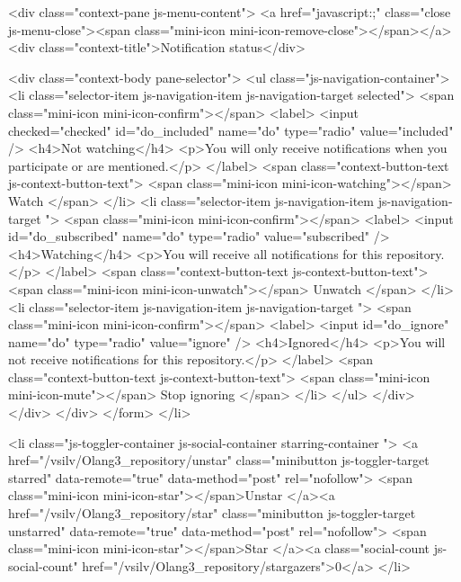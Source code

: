     <div class="context-pane js-menu-content">
      <a href="javascript:;" class="close js-menu-close"><span class="mini-icon mini-icon-remove-close"></span></a>
      <div class="context-title">Notification status</div>

      <div class="context-body pane-selector">
        <ul class="js-navigation-container">
          <li class="selector-item js-navigation-item js-navigation-target selected">
            <span class="mini-icon mini-icon-confirm"></span>
            <label>
              <input checked="checked" id="do_included" name="do" type="radio" value="included" />
              <h4>Not watching</h4>
              <p>You will only receive notifications when you participate or are mentioned.</p>
            </label>
            <span class="context-button-text js-context-button-text">
              <span class="mini-icon mini-icon-watching"></span>
              Watch
            </span>
          </li>
          <li class="selector-item js-navigation-item js-navigation-target ">
            <span class="mini-icon mini-icon-confirm"></span>
            <label>
              <input id="do_subscribed" name="do" type="radio" value="subscribed" />
              <h4>Watching</h4>
              <p>You will receive all notifications for this repository.</p>
            </label>
            <span class="context-button-text js-context-button-text">
              <span class="mini-icon mini-icon-unwatch"></span>
              Unwatch
            </span>
          </li>
          <li class="selector-item js-navigation-item js-navigation-target ">
            <span class="mini-icon mini-icon-confirm"></span>
            <label>
              <input id="do_ignore" name="do" type="radio" value="ignore" />
              <h4>Ignored</h4>
              <p>You will not receive notifications for this repository.</p>
            </label>
            <span class="context-button-text js-context-button-text">
              <span class="mini-icon mini-icon-mute"></span>
              Stop ignoring
            </span>
          </li>
        </ul>
      </div>
    </div>
  </div>
</form>
          </li>

          <li class="js-toggler-container js-social-container starring-container ">
            <a href="/vsilv/Olang3_repository/unstar" class="minibutton js-toggler-target starred" data-remote="true" data-method="post" rel="nofollow">
              <span class="mini-icon mini-icon-star"></span>Unstar
            </a><a href="/vsilv/Olang3_repository/star" class="minibutton js-toggler-target unstarred" data-remote="true" data-method="post" rel="nofollow">
              <span class="mini-icon mini-icon-star"></span>Star
            </a><a class="social-count js-social-count" href="/vsilv/Olang3_repository/stargazers">0</a>
          </li>


